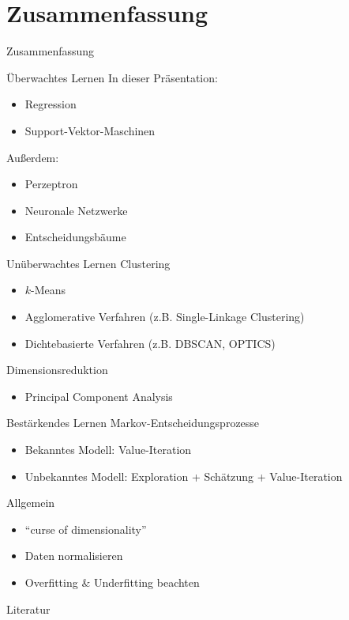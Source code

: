 \documentclass[xcolor={dvipsnames,svgnames},draft]{beamer}
\begin{document}
\section{Zusammenfassung}

\begin{frame}[allowframebreaks]{Zusammenfassung}

  \begin{block}{Überwachtes Lernen}
  In dieser Präsentation:
  \begin{itemize}
  \item Regression
  \item Support-Vektor-Maschinen
  \end{itemize}
  Außerdem:
  \begin{itemize}
  \item Perzeptron
  \item Neuronale Netzwerke
  \item Entscheidungsbäume
  \end{itemize}
  \end{block}
  \framebreak
  \begin{block}{Unüberwachtes Lernen}
    Clustering
    \begin{itemize}
    \item $k$-Means
    \item Agglomerative Verfahren (z.B. Single-Linkage Clustering)
    \item Dichtebasierte Verfahren (z.B. DBSCAN, OPTICS)
    \end{itemize}
    Dimensionsreduktion
    \begin{itemize}
    \item Principal Component Analysis
    \end{itemize}
  \end{block}
  \framebreak
  \begin{block}{Bestärkendes Lernen}
    Markov-Entscheidungsprozesse
    \begin{itemize}
    \item Bekanntes Modell: Value-Iteration
    \item Unbekanntes Modell: Exploration + Schätzung + Value-Iteration
    \end{itemize}
  \end{block}
  \begin{block}{Allgemein}
    \begin{itemize}
    \item "`curse of dimensionality"'
    \item Daten normalisieren
    \item Overfitting \& Underfitting beachten
    \end{itemize}
  \end{block}

\end{frame}

\begin{frame}[shrink=10]{Literatur}
  \nocite{Bishop2006,CourseeraAndrewNg,Russell02artificialintelligence}
  \printbibliography[heading=none]
\end{frame}
\end{document}
